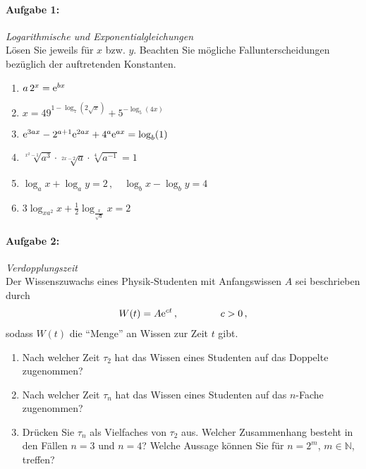 
\paragraph{Aufgabe 1: } \emph{Logarithmische und Exponentialgleichungen}\\[0.2cm]
Lösen Sie jeweils für $x$ bzw. $y$. Beachten Sie mögliche Fallunterscheidungen bezüglich der auftretenden Konstanten.\\[-1.3em]
\begin{enumerate}[label=(\alph*)]
    \item $a\,2^x=\mathrm{e}^{bx}$
    \item $x=49^{1-\log_7(2\sqrt{x})}+5^{-\log_5(4x)}$
    \item $\mathrm{e}^{3ax}-2^{a+1}\mathrm{e}^{2ax}+4^a\mathrm{e}^{ax}=\log_b(1)$
    \item $\sqrt[x^2-1]{a^3}\cdot\sqrt[2x-2]{a}\cdot\sqrt[4]{a^{-1}}=1$
    \item $\log_ax+\log_ay=2\,, \quad\log_bx-\log_by=4$
    \item $3\log_{xa^2}x+\frac{1}{2}\log_\frac{x}{\sqrt{a}}x=2$
\end{enumerate}

\paragraph{Aufgabe 2: } \emph{Verdopplungszeit}\\[0.2cm]
Der Wissenszuwachs eines Physik-Studenten mit Anfangswissen $A$ sei beschrieben durch
\begin{align*}
    W(t)=A\mathrm{e}^{c t}\,, \hspace{1.5cm} c>0\,,
\end{align*}
sodass $W(t)$ die "`Menge"' an Wissen zur Zeit $t$ gibt.
\begin{enumerate}[label=(\alph*)]
    \item Nach welcher Zeit $\tau_2$ hat das Wissen eines Studenten auf das Doppelte zugenommen?
    \item Nach welcher Zeit $\tau_n$ hat das Wissen eines Studenten auf das $n$-Fache zugenommen?
    \item Drücken Sie $\tau_n$ als Vielfaches von $\tau_2$ aus. Welcher Zusammenhang besteht in den Fällen $n=3$ und $n=4$? Welche Aussage können Sie für $n=2^m$, $m\in\mathbb{N}$, treffen?
\end{enumerate}

